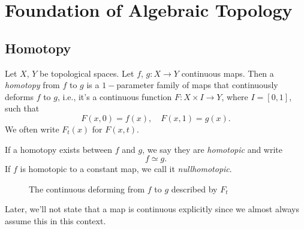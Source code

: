 \section{Foundation of Algebraic Topology}
\subsection{Homotopy}
\begin{definition}\label{def:homotopy}\label{def:homotopic}\label{def:nullhomotopic}
	Let \(X\), \(Y\) be topological spaces. Let \(f\), \(g\colon X\to Y\) continuous maps. Then a \emph{homotopy} from \(f\)
	to \(g\) is a \(1-\)parameter family of maps that continuously deforms \(f\) to \(g\), i.e., it's a continuous function
	\(F\colon X\times I\to Y\), where \(I=\left[0,1\right]\), such that
	\[
		F(x, 0) = f(x),\quad F(x, 1) = g(x).
	\]
	We often write \(F_{t}(x)\) for \(F(x, t)\).

	If a homotopy exists between \(f\) and \(g\), we say they are \emph{homotopic} and write
	\[
		f\simeq g.
	\]
	If \(f\) is homotopic to a constant map, we call it \emph{nullhomotopic}.
\end{definition}
\begin{figure}[H]
	\centering
	\caption{The continuous deforming from \(f\) to \(g\) described by \(F_t\)}
	\label{fig:def:homotopy}
\end{figure}

\begin{remark}
	Later, we'll not state that a map is continuous explicitly since we almost always assume this in this context.
\end{remark}

